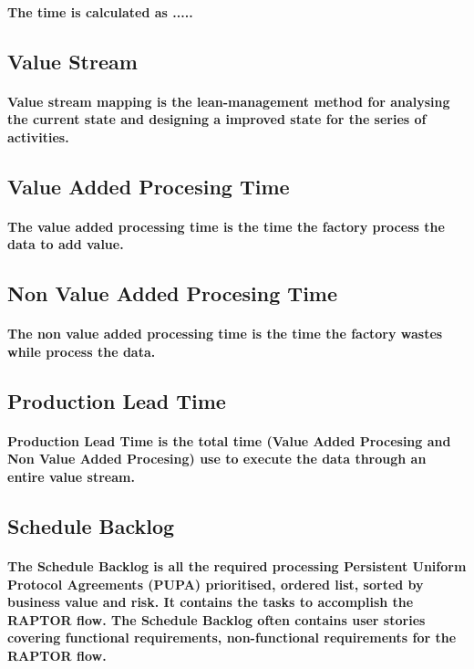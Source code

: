 \documentclass{acm_proc_article-sp}
\begin{document}
\paragraph{The time is calculated as .....}
\subsection{Value Stream}
\paragraph{Value stream mapping is the lean-management method for analysing the current state and designing a improved state for the series of activities.}
\subsection{Value Added Procesing Time}
\paragraph{The value added processing time is the time the factory process the data to add value.}
\subsection{Non Value Added Procesing Time}
\paragraph{The non value added processing time is the time the factory wastes while process the data.}
\subsection{Production Lead Time}
\paragraph{Production Lead Time is the total time (Value Added Procesing and Non Value Added Procesing) use to execute the data through an entire value stream.}
\subsection{Schedule Backlog}
\paragraph{The Schedule Backlog is all the required processing Persistent Uniform Protocol Agreements (PUPA) prioritised, ordered list, sorted by business value and risk. It contains the tasks to accomplish the RAPTOR flow. The Schedule Backlog often contains user stories covering functional requirements, non-functional requirements for the RAPTOR flow.}
\end{document}
